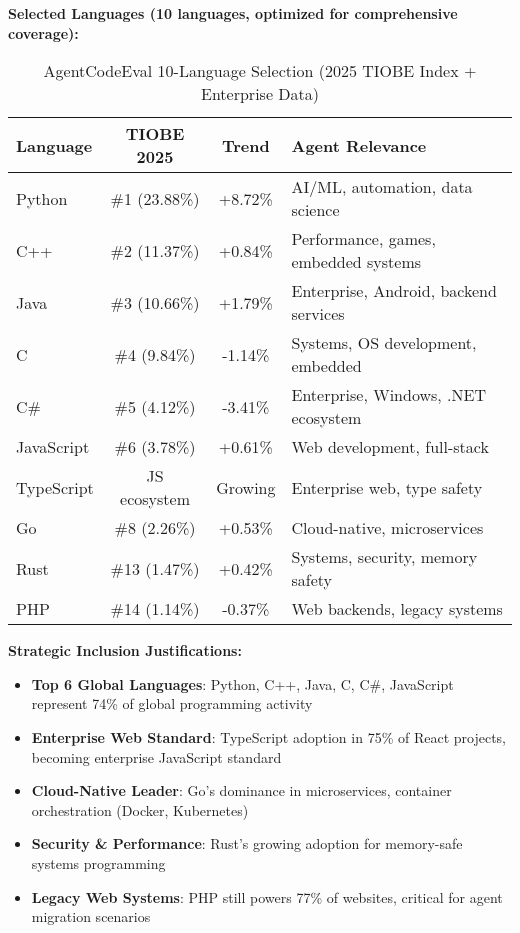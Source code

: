 \documentclass{article}
\begin{document}
\textbf{Selected Languages (10 languages, optimized for comprehensive coverage):}

\begin{table}[h]
\centering
\begin{tabular}{|l|c|c|l|}
\hline
\textbf{Language} & \textbf{TIOBE 2025} & \textbf{Trend} & \textbf{Agent Relevance} \\
\hline
Python & \#1 (23.88\%) & +8.72\% & AI/ML, automation, data science \\
C++ & \#2 (11.37\%) & +0.84\% & Performance, games, embedded systems \\
Java & \#3 (10.66\%) & +1.79\% & Enterprise, Android, backend services \\
C & \#4 (9.84\%) & -1.14\% & Systems, OS development, embedded \\
C\# & \#5 (4.12\%) & -3.41\% & Enterprise, Windows, .NET ecosystem \\
JavaScript & \#6 (3.78\%) & +0.61\% & Web development, full-stack \\
TypeScript & JS ecosystem & Growing & Enterprise web, type safety \\
Go & \#8 (2.26\%) & +0.53\% & Cloud-native, microservices \\
Rust & \#13 (1.47\%) & +0.42\% & Systems, security, memory safety \\
PHP & \#14 (1.14\%) & -0.37\% & Web backends, legacy systems \\
\hline
\end{tabular}
\caption{AgentCodeEval 10-Language Selection (2025 TIOBE Index + Enterprise Data)}
\end{table}

\textbf{Strategic Inclusion Justifications:}
\begin{itemize}
    \item \textbf{Top 6 Global Languages}: Python, C++, Java, C, C\#, JavaScript represent 74\% of global programming activity
    \item \textbf{Enterprise Web Standard}: TypeScript adoption in 75\% of React projects, becoming enterprise JavaScript standard
    \item \textbf{Cloud-Native Leader}: Go's dominance in microservices, container orchestration (Docker, Kubernetes)
    \item \textbf{Security \& Performance}: Rust's growing adoption for memory-safe systems programming
    \item \textbf{Legacy Web Systems}: PHP still powers 77\% of websites, critical for agent migration scenarios
\end{itemize}
\end{document}
